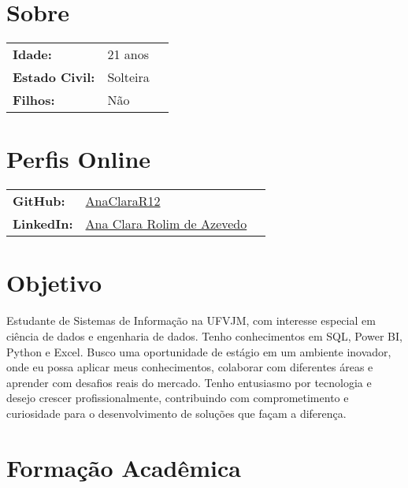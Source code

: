 \documentclass[11pt,a4paper]{moderncv} %
\begin{document}
\maketitle %


\section{Sobre}
\begin{tabular}{@{}lll} %
    \textbf{Idade:} & 21 anos & \\
    \textbf{Estado Civil: } & Solteira & \\
    \textbf{Filhos:} & Não & \\
\end{tabular}

\section{Perfis Online}
\begin{tabular}{@{}lll}
    \textbf{GitHub:} & \hspace{0.75cm}\href{https://github.com/AnaClaraR12}{AnaClaraR12} & \\
    \textbf{LinkedIn:} & \hspace{0.75cm}\href{https://www.linkedin.com/in/ana-clara-rolim-de-azevedo-450789334}{Ana Clara Rolim de Azevedo} & \\
\end{tabular}
\section{Objetivo}
\justify Estudante de Sistemas de Informação na UFVJM, com interesse especial em ciência de dados e engenharia de dados. Tenho conhecimentos em SQL, Power BI, Python e Excel. Busco uma oportunidade de estágio em um ambiente inovador, onde eu possa aplicar meus conhecimentos, colaborar com diferentes áreas e aprender com desafios reais do mercado. Tenho entusiasmo por tecnologia e desejo crescer profissionalmente, contribuindo com comprometimento e curiosidade para o desenvolvimento de soluções que façam a diferença.


\section{Formação Acadêmica}
\end{document}

